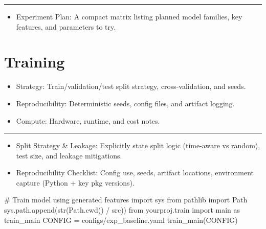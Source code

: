 \documentclass[
  letterpaper,
  DIV=11,
  numbers=noendperiod]{scrartcl}
\newenvironment{Shaded}{\begin{snugshade}}{\end{snugshade}}
\newcommand{\BuiltInTok}[1]{\textcolor[rgb]{0.00,0.23,0.31}{#1}}
\newcommand{\CommentTok}[1]{\textcolor[rgb]{0.37,0.37,0.37}{#1}}
\newcommand{\ImportTok}[1]{\textcolor[rgb]{0.00,0.46,0.62}{#1}}
\newcommand{\NormalTok}[1]{\textcolor[rgb]{0.00,0.23,0.31}{#1}}
\newcommand{\OperatorTok}[1]{\textcolor[rgb]{0.37,0.37,0.37}{#1}}
\newcommand{\StringTok}[1]{\textcolor[rgb]{0.13,0.47,0.30}{#1}}
\providecommand{\tightlist}{%
  \setlength{\itemsep}{0pt}\setlength{\parskip}{0pt}}
\renewenvironment{Shaded}{%
  \begin{tcolorbox}[%
    enhanced,%
    colback=codebg,%
    colframe=codebg,%
    borderline west={3pt}{0pt}{sectionblue},%
    boxrule=0pt,%
    arc=0pt,%
    boxsep=5pt,%
    left=2mm,%
    right=2mm,%
    top=2mm,%
    bottom=2mm%
  ]%
}{%
  \end{tcolorbox}%
}
\begin{document}
\begin{center}\rule{0.5\linewidth}{0.5pt}\end{center}

\begin{itemize}
\tightlist
\item
  Experiment Plan: A compact matrix listing planned model families, key
  features, and parameters to try.
\end{itemize}

\section{Training}\label{training}

\begin{itemize}
\tightlist
\item
  Strategy: Train/validation/test split strategy, cross-validation, and
  seeds.
\item
  Reproducibility: Deterministic seeds, config files, and artifact
  logging.
\item
  Compute: Hardware, runtime, and cost notes.
\end{itemize}

\begin{center}\rule{0.5\linewidth}{0.5pt}\end{center}

\begin{itemize}
\tightlist
\item
  Split Strategy \& Leakage: Explicitly state split logic (time-aware vs
  random), test size, and leakage mitigations.
\item
  Reproducibility Checklist: Config use, seeds, artifact locations,
  environment capture (Python + key pkg versions).
\end{itemize}

\begin{Shaded}
\begin{Highlighting}[]
\CommentTok{\# Train model using generated features}
\ImportTok{import}\NormalTok{ sys}
\ImportTok{from}\NormalTok{ pathlib }\ImportTok{import}\NormalTok{ Path}
\NormalTok{sys.path.append(}\BuiltInTok{str}\NormalTok{(Path.cwd() }\OperatorTok{/} \StringTok{\textquotesingle{}src\textquotesingle{}}\NormalTok{))}
\ImportTok{from}\NormalTok{ yourproj.train }\ImportTok{import}\NormalTok{ main }\ImportTok{as}\NormalTok{ train\_main}
\NormalTok{CONFIG }\OperatorTok{=} \StringTok{\textquotesingle{}configs/exp\_baseline.yaml\textquotesingle{}}
\NormalTok{train\_main(CONFIG)}
\end{Highlighting}
\end{Shaded}
\end{document}
